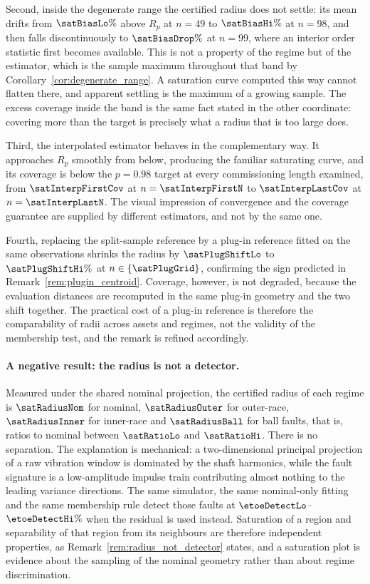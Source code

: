 \documentclass[a4paper]{cas-sc}
\begin{document}
Second, inside the degenerate range the certified radius does not settle: its
mean drifts from \(\satBiasLo\%\) above \(R_p\) at \(n=49\) to
\(\satBiasHi\%\) at \(n=98\), and then falls discontinuously to
\(\satBiasDrop\%\) at \(n=99\), where an interior order statistic first
becomes available. This is not a property of the regime but of the estimator,
which is the sample maximum throughout that band by
Corollary~\ref{cor:degenerate_range}. A saturation curve computed this way
cannot flatten there, and apparent settling is the maximum of a growing
sample. The excess coverage inside the band is the same fact stated in the
other coordinate: covering more than the target is precisely what a radius
that is too large does.

Third, the interpolated estimator behaves in the complementary way. It
approaches \(R_p\) smoothly from below, producing the familiar saturating
curve, and its coverage is below the \(p=0.98\) target at every commissioning
length examined, from \(\satInterpFirstCov\) at \(n=\satInterpFirstN\) to
\(\satInterpLastCov\) at \(n=\satInterpLastN\). The visual impression of
convergence and the coverage guarantee are supplied by different estimators,
and not by the same one.

Fourth, replacing the split-sample reference by a plug-in reference fitted on
the same observations shrinks the radius by \(\satPlugShiftLo\) to
\(\satPlugShiftHi\%\) at \(n\in\{\satPlugGrid\}\), confirming the sign
predicted in Remark~\ref{rem:plugin_centroid}. Coverage, however, is not degraded, because
the evaluation distances are recomputed in the same plug-in geometry and the
two shift together. The practical cost of a plug-in reference is therefore the
comparability of radii across assets and regimes, not the validity of the
membership test, and the remark is refined accordingly.

\paragraph{A negative result: the radius is not a detector.}
Measured under the shared nominal projection, the certified radius of each
regime is \(\satRadiusNom\) for nominal, \(\satRadiusOuter\) for outer-race,
\(\satRadiusInner\) for inner-race and \(\satRadiusBall\) for ball faults,
that is, ratios to nominal between \(\satRatioLo\) and \(\satRatioHi\). There
is no separation. The explanation is mechanical: a two-dimensional principal
projection of a raw vibration window is dominated by the shaft harmonics,
while the fault signature is a low-amplitude impulse train contributing almost
nothing to the leading variance directions. The same simulator, the same
nominal-only fitting and the same membership rule detect those faults at
\(\etoeDetectLo\)--\(\etoeDetectHi\%\) when the residual is used instead.
Saturation of a region and separability of that region from its neighbours are
therefore independent properties, as
Remark~\ref{rem:radius_not_detector} states, and a saturation plot is evidence
about the sampling of the nominal geometry rather than about regime
discrimination.
\end{document}
